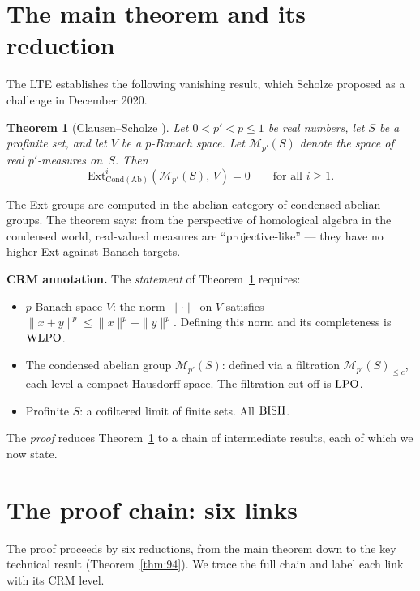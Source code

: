 \documentclass[11pt,a4paper]{article}
\theoremstyle{plain}
\newtheorem{theorem}{Theorem}[section]
\theoremstyle{definition}
\newcommand{\BISH}{\textup{BISH}}
\newcommand{\WLPO}{\textup{WLPO}}
\newcommand{\LPO}{\textup{LPO}}
\begin{document}
\section{The main theorem and its reduction}\label{sec:main-thm}

The LTE establishes the following vanishing result, which
Scholze proposed as a challenge in December 2020.

\begin{theorem}[Clausen--Scholze {\cite{Scholze2020}}]\label{thm:lte-main}
Let $0 < p' < p \leq 1$ be real numbers, let $S$ be a profinite set,
and let $V$ be a $p$-Banach space.  Let $\mathcal{M}_{p'}(S)$ denote
the space of real $p'$-measures on~$S$.  Then
\[
  \mathrm{Ext}^i_{\mathrm{Cond}(\mathrm{Ab})}(\mathcal{M}_{p'}(S),\, V) = 0
  \qquad \text{for all } i \geq 1.
\]
\end{theorem}

The Ext-groups are computed in the abelian category of condensed
abelian groups.  The theorem says: from the perspective of homological
algebra in the condensed world, real-valued measures are
``projective-like'' --- they have no higher Ext against Banach targets.

\medskip
\noindent\textbf{CRM annotation.}
The \emph{statement} of Theorem~\ref{thm:lte-main} requires:
\begin{itemize}[nosep]
\item $p$-Banach space $V$: the norm $\|\cdot\|$ on $V$ satisfies
  $\|x + y\|^p \leq \|x\|^p + \|y\|^p$.  Defining
  this norm and its completeness is $\WLPO$.
\item The condensed abelian group $\mathcal{M}_{p'}(S)$:
  defined via a filtration $\mathcal{M}_{p'}(S)_{\leq c}$, each
  level a compact Hausdorff space.  The filtration cut-off is $\LPO$.
\item Profinite $S$: a cofiltered limit of finite sets.  All $\BISH$.
\end{itemize}

\noindent The \emph{proof} reduces Theorem~\ref{thm:lte-main} to a
chain of intermediate results, each of which we now state.

\section{The proof chain: six links}\label{sec:proof-chain}

The proof proceeds by six reductions, from the main theorem down to
the key technical result (Theorem~\ref{thm:94}).  We trace the full
chain and label each link with its CRM level.
\end{document}
